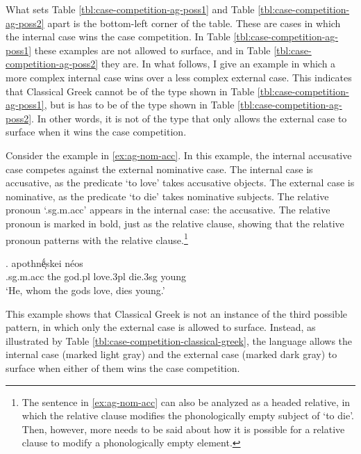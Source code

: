 What sets Table \ref{tbl:case-competition-ag-poss1} and Table \ref{tbl:case-competition-ag-poss2} apart is the bottom-left corner of the table. These are cases in which the internal case wins the case competition.
In Table \ref{tbl:case-competition-ag-poss1} these examples are not allowed to surface, and in Table \ref{tbl:case-competition-ag-poss2} they are.
In what follows, I give an example in which a more complex internal case wins over a less complex external case. This indicates that Classical Greek cannot be of the type shown in Table \ref{tbl:case-competition-ag-poss1}, but is has to be of the type shown in Table \ref{tbl:case-competition-ag-poss2}. In other words, it is not of the type that only allows the external case to surface when it wins the case competition.

Consider the example in \ref{ex:ag-nom-acc}. In this example, the internal accusative case competes against the external nominative case.
The internal case is accusative, as the predicate  `to love' takes accusative objects.
The external case is nominative, as the predicate  `to die' takes nominative subjects.
The relative pronoun  `.\ac{sg}.\ac{m}.\ac{acc}' appears in the internal case: the accusative. The relative pronoun is marked in bold, just as the relative clause, showing that the relative pronoun patterns with the relative clause.\footnote{
The sentence in \ref{ex:ag-nom-acc} can also be analyzed as a headed relative, in which the relative clause modifies the phonologically empty subject of  `to die'. Then, however, more needs to be said about how it is possible for a relative clause to modify a phonologically empty element.
}

\exg.     apothnḗͅskei néos\\
.\ac{sg}.\ac{m}.\ac{acc} the god.\ac{pl} love.3\ac{pl}\scsub{[acc]} die.3\ac{sg}\scsub{[nom]} young\\
`He, whom the gods love, dies young.' \label{ex:ag-nom-acc}

This example shows that Classical Greek is not an instance of the third possible pattern, in which only the external case is allowed to surface. Instead, as illustrated by Table \ref{tbl:case-competition-classical-greek}, the language allows the internal case (marked light gray) and the external case (marked dark gray) to surface when either of them wins the case competition.

